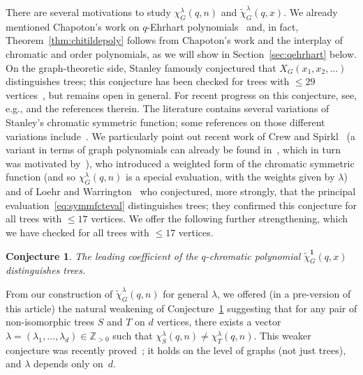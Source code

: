 \documentclass[11pt]{amsart}
\newtheorem{theorem}{Theorem} %
\newtheorem{conjecture}{Conjecture}
\newcommand\ZZ{\mathbb{Z}}
\newcommand\bone{\mathbf{1}}
\begin{document}
There are several motivations to study $\chi_G^\lambda(q,n)$ and $\widetilde{\chi}_G^\lambda(q,x)$.
We already mentioned Chapoton's work on $q$-Ehrhart polynomials~\cite{Chapoton} and, in fact, Theorem~\ref{thm:chitildepoly} follows from Chapoton's work and the interplay of chromatic and order polynomials, as we will show in Section~\ref{sec:qehrhart} below.
On the graph-theoretic side, Stanley famously conjectured that $X_G(x_1,x_2,\hdots)$
distinguishes trees; this conjecture has been checked for trees with $\le 29$
vertices~\cite{heilji}, but remains open in general. For recent progress on this conjecture,
see, e.g., \cite{aliniaeifardvanWilligenburg, alisteprietoetal} and the references therein.
The literature contains several variations of Stanley's chromatic symmetric function; some references on those different variations include~\cite{gebhardsagan,shareshianwachs,hasebetsujie,pawlowski,alisteprietoetal}.
We particularly point out recent work of Crew and Spirkl~\cite{crewspirkl} 
(a variant in terms of graph polynomials can already be found in~\cite{noblewelsh}, which in turn
was motivated by~\cite{chmutovduzhinlando}),
who introduced a weighted form of the chromatic symmetric function (and so $\chi_G^\lambda(q,n)$ is a special evaluation, with the weights given by $\lambda$)
and of Loehr and Warrington~\cite{loehrwarrington} who conjectured, more strongly, that the principal evaluation~\eqref{eq:symmfcteval} distinguishes trees; they confirmed this conjecture for all trees with $\le 17$ vertices.
We offer the following further strengthening, which we have checked for all trees with $\le 17$ vertices. 

\begin{conjecture}\label{conj:main}
The leading coefficient of the $q$-chromatic polynomial $\widetilde{\chi}_G^\bone(q,x)$ distinguishes trees.
\end{conjecture}

From our construction of $\widetilde{\chi}^\lambda_G(q,n)$ for general $\lambda$, we offered (in a pre-version
of this article) the natural
weakening of Conjecture~\ref{conj:main} suggesting that for any pair of non-isomorphic trees $S$ and $T$ on $d$ vertices, there exists a vector $\lambda=(\lambda_1,\hdots,\lambda_d)\in \ZZ_{>0}$ such that $\chi_S^\lambda(q,n)\neq \chi_T^\lambda(q,n)$.
This weaker conjecture was recently proved~\cite{generatingfunctionsqchromaticpolynomials}; it holds on the
level of graphs (not just trees), and $\lambda$ depends only on~$d$. 

\end{document}
